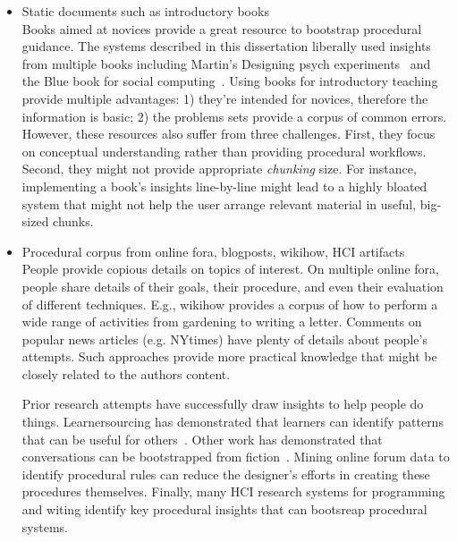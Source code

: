 \begin{itemize}
\item Static documents such as introductory books\\
Books aimed at novices provide a great resource to bootstrap procedural guidance. The systems described in this dissertation liberally used insights from multiple books including Martin’s Designing psych experiments~\cite{Martin2007} and the Blue book for social computing~\cite{Resnick2011}. Using books for introductory teaching provide multiple advantages: 1) they're intended for novices, therefore the information is basic; 2) the problems sets provide a corpus of common errors. However, these resources also suffer from three challenges. First, they focus on conceptual understanding rather than providing procedural workflows. Second, they might not provide appropriate \textit{chunking} size. For instance, implementing a book's insights line-by-line might lead to a highly bloated system that might not help the user arrange relevant material in useful, big-sized chunks. 

\item Procedural corpus from online fora, blogposts, wikihow, HCI artifacts\\
People provide copious details on topics of interest. On multiple online fora, people share details of their goals, their procedure, and even their evaluation of different techniques. E.g., wikihow provides a corpus of how to perform a wide range of activities from gardening to writing a letter. Comments on popular news articles (e.g. NYtimes) have plenty of details about people's attempts. Such approaches provide more practical knowledge that might be closely related to the author\textquotesingle s content. 

Prior research attempts have successfully draw insights to help people do things. Learnersourcing has demonstrated that learners can identify patterns that can be useful for others~\cite{Kim2015f}. Other work has demonstrated that conversations can be bootstrapped from fiction~\cite{fast2016empath}. Mining online forum data to identify procedural rules can reduce the designer's efforts in creating these procedures themselves. Finally, many HCI research systems for programming and witing identify key procedural insights that can bootsreap procedural systems. 


\end{itemize}
